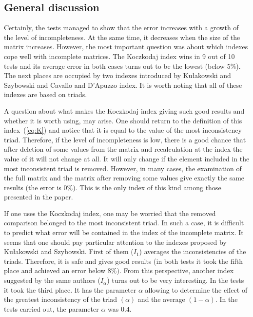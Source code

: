 \subsection{General discussion}
Certainly, the tests managed to show that the error increases with a growth of the level of incompleteness. At the same time, it decreases when the size of the matrix increases. However, the most important question was about which indexes cope well with incomplete matrices. The Koczkodaj index wins in 9 out of 10 tests and its average error in both cases turns out to be the lowest (below $5\%$). The next places are occupied by two indexes introduced by Kułakowski and Szybowski and Cavallo and D'Apuzzo index. It is worth noting that all of these indexes are based on triads.

A question about what makes the Koczkodaj index giving such good results and whether it is worth using, may arise. One should return to the definition of this index~(\ref{eq:K}) and notice that it is equal to the value of the most inconsistency triad. Therefore, if the level of incompleteness is low, there is a good chance that after deletion of some values from the matrix and recalculation at the index the value of it will not change at all. It will only change if the element included in the most inconsistent triad is removed. However, in many cases, the examination of the full matrix and the matrix after removing some values give exactly the same results (the error is $0\%$). This is the only index of this kind among those presented in the paper.

If one uses the Koczkodaj index, one may be worried that the removed comparison belonged to the most inconsistent triad. In such a case, it is difficult to predict what error will be contained in the index of the incomplete matrix. It seems that one should pay particular attention to the indexes proposed by Kułakowski and Szybowski. First of them ($I_1$) averages the inconsistencies of the triads. Therefore, it is safe and gives good results (in both tests it took the fifth place and achieved an error below $8\%$). From this perspective, another index suggested by the same authors ($I_\alpha$) turns out to be very interesting. In the tests it took the third place. It has the parameter $\alpha$ allowing to determine the effect of the greatest inconsistency of the triad $\left(\alpha\right)$ and the average $\left(1-\alpha\right)$. In the tests carried out, the parameter $\alpha$ was $0.4$.